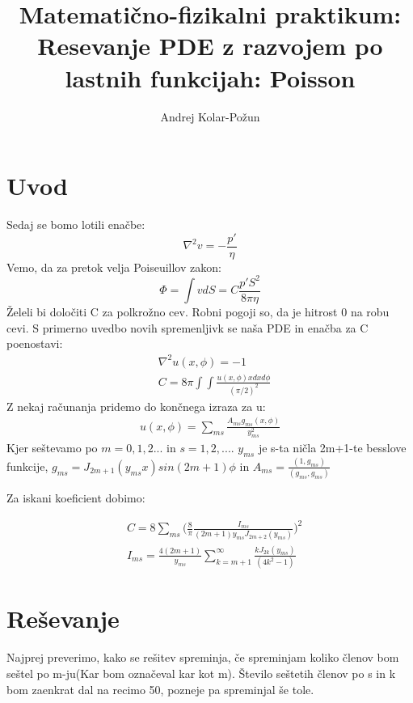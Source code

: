 \documentclass{article}
\title{Matemati{\v c}no-fizikalni praktikum: Resevanje PDE z razvojem po lastnih funkcijah: Poisson}
\author{Andrej Kolar-Po{\v z}un}
\begin{document}
\maketitle
\newpage
{}

\section{Uvod}

Sedaj se bomo lotili enačbe:
\begin{equation*}
\nabla^2 v = - \frac{p'}{\eta}
\end{equation*}
Vemo, da za pretok velja Poiseuillov zakon:
\begin{equation*}
\Phi = \int v dS = C \frac{p' S^2}{8 \pi \eta}
\end{equation*}
Želeli bi določiti C za polkrožno cev. Robni pogoji so, da je hitrost 0 na robu cevi.
S primerno uvedbo novih spremenljivk se naša PDE in enačba za C poenostavi:
\begin{align*}
&\nabla^2 u(x,\phi) = -1 \\
&C = 8\pi \int \int \frac{u(x,\phi) x dx d\phi}{(\pi/2)^2}
\end{align*}
Z nekaj računanja pridemo do končnega izraza za u:
\begin{align*}
u(x,\phi) = \sum_{ms} \frac{A_{ms} g_{ms}(x,\phi)}{y_{ms}^2}
\end{align*}
Kjer seštevamo po $m=0,1,2...$ in $s=1,2,...$.
$y_{ms}$ je s-ta ničla 2m+1-te besslove funkcije,
$g_{ms} = J_{2 m+1}(y_{ms}x) sin(2m+1)\phi$ in 
$A_{ms} = \frac{(1,g_{ms})}{(g_{ms},g_{ms})}$

Za iskani koeficient dobimo:

\begin{align*}
&C = 8 \sum_{ms} \Big( \frac{8}{\pi} \frac{I_{ms}}{(2m+1)y_{ms}J_{2m+2}(y_{ms})}\Big)^2 \\
& I_{ms} = \frac{4(2m+1)}{y_{ms}} \sum_{k=m+1}^{\infty} \frac{k J_{2k} (y_{ms})}{(4k^2-1)}
\end{align*}

\newpage
\section{Reševanje}

Najprej preverimo, kako se rešitev spreminja, če spreminjam koliko členov bom seštel po m-ju(Kar bom označeval kar kot m). 
Število seštetih členov po s in k bom zaenkrat dal na recimo 50, pozneje pa spreminjal še tole.
\end{document}
